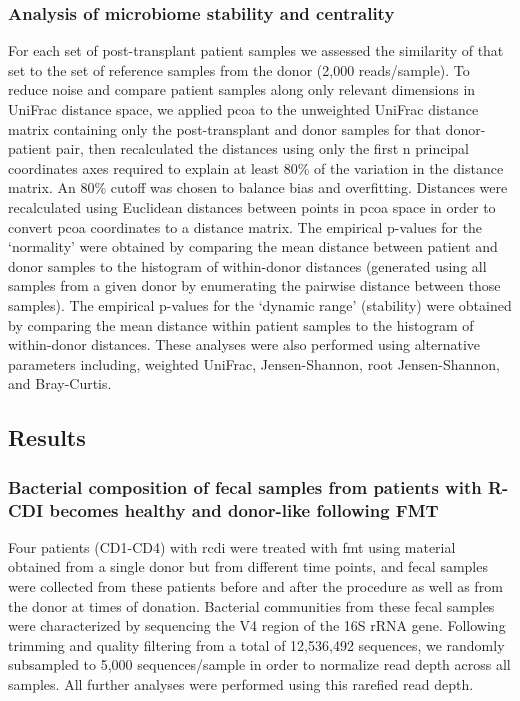 \subsubsection{Analysis of microbiome stability and centrality}
For each set of post-transplant patient samples we assessed the similarity of that set to the set of reference samples from the donor (2,000 reads/sample). To reduce noise and compare patient samples along only relevant dimensions in UniFrac distance space, we applied \gls{pcoa} to the unweighted UniFrac distance matrix containing only the post-transplant and donor samples for that donor-patient pair, then recalculated the distances using only the first n principal coordinates axes required to explain at least 80\% of the variation in the distance matrix. An 80\% cutoff was chosen to balance bias and overfitting. Distances were recalculated using Euclidean distances between points in \gls{pcoa} space in order to convert \gls{pcoa} coordinates to a distance matrix. The empirical p-values for the `normality' were obtained by comparing the mean distance between patient and donor samples to the histogram of within-donor distances (generated using all samples from a given donor by enumerating the pairwise distance between those samples). The empirical p-values for the `dynamic range' (stability) were obtained by comparing the mean distance within patient samples to the histogram of within-donor distances. These analyses were also performed using alternative parameters including, weighted UniFrac, Jensen-Shannon, root Jensen-Shannon, and Bray-Curtis.


\subsection{Results}
\subsubsection{Bacterial composition of fecal samples from patients with R-CDI becomes healthy and donor-like following FMT}

Four patients (CD1-CD4) with \gls{rcdi} were treated with \gls{fmt} using material obtained from a single donor but from different time points, and fecal samples were collected from these patients before and after the procedure as well as from the donor at times of donation. Bacterial communities from these fecal samples were characterized by sequencing the V4 region of the 16S rRNA gene. Following trimming and quality filtering from a total of 12,536,492 sequences, we randomly subsampled to 5,000 sequences/sample in order to normalize read depth across all samples. All further analyses were performed using this rarefied read depth.

